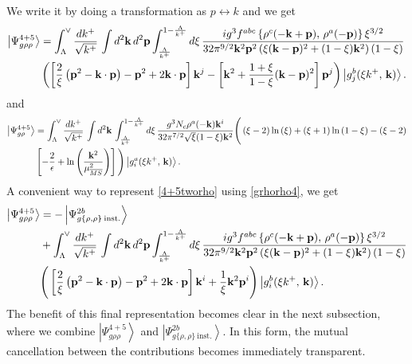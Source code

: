 \documentclass[aps,prd,amsmath,amssymb,nofootinbib]{revtex4-2}
\numberwithin{equation}{section}
\begin{document}
We write it by doing a transformation as $p\leftrightarrow k$ and we get 
\begin{align}\label{4+5tworho}
\left|\Psi_{g\rho\rho}^{4+5}\right\rangle & =
\int_{\Lambda}^{\vee}\frac{dk^{+}}{\sqrt{k^{+}}}\,\int d^{2}\mathbf{k}\, d^{2}\mathbf{p}\int_{\frac{\Lambda}{k^{+}}}^{1-\frac{\Lambda}{k^{+}}}d\xi\,\frac{ig^{3}f^{abc}\left\{ \rho^{c}(-\mathbf{k}+\mathbf{p}),\,\rho^{a}(-\mathbf{p})\right\} \xi^{3/2}}{32\pi^{9/2}\mathbf{k}^{2}\mathbf{p}^{2}\left(\xi(\mathbf{k}-\mathbf{p})^{2}+(1-\xi)\mathbf{k}^{2}\right)(1-\xi)}\notag \\ & \left(\left[\frac{2}{\xi}\left(\mathbf{p}^{2}-\mathbf{k}\cdot \mathbf{p}\right)-\mathbf{p}^{2}+2\mathbf{k}\cdot \mathbf{p}\right]\mathbf{k}^{j}-\left[\mathbf{k}^{2}+\frac{1+\xi}{1-\xi}(\mathbf{k}-\mathbf{p})^{2}\right]\mathbf{p}^{j}\right)\left|g_{j}^{b}(\xi k^{+},\, \mathbf{k})\right\rangle.
\end{align}
and
\begin{align}\label{4+5onerho}
   \left|\Psi_{g\rho}^{4+5}\right\rangle & =  \int_{\Lambda}^{\vee}\frac{dk^{+}}{\sqrt{k^{+}}}\,\int d^{2}\mathbf{k}\,\int_{\frac{\Lambda}{k^{+}}}^{1-\frac{\Lambda}{k^{+}}}d\xi\,\frac{g^{3}N_{c}\rho^{a}(-\mathbf{k})\mathbf{k}^{i}}{32\pi^{7/2}\sqrt{\xi}(1-\xi)\mathbf{k}^{2}}\Bigg(\left(\xi-2\right)\ln\left(\xi\right)+\left(\xi+1\right)\ln\left(1-\xi\right)-\left(\xi-2\right)\notag \\ & \left[-\frac{2}{\epsilon}+\ln\left(\frac{\mathbf{k}^{2}}{\mu_{\overline{MS}}^{2}}\right)\right]\Bigg)\left|g_{i}^{a}(\xi k^{+},\, \mathbf{k})\right\rangle.
\end{align}
A convenient way to represent \eqref{4+5tworho} using \eqref{grhorho4}, we get
\begin{align}\label{4+5tworhosimpl}
\left|\Psi_{g\rho\rho}^{4+5}\right\rangle & =-\left|\Psi_{g\{\rho,\rho\}\:\text{inst.}}^{2b}\right\rangle \notag \\ & 
+\int_{\Lambda}^{\vee}\frac{dk^{+}}{\sqrt{k^{+}}}\,\int d^{2}\mathbf{k}\, d^{2}\mathbf{p}\int_{\frac{\Lambda}{k^{+}}}^{1-\frac{\Lambda}{k^{+}}}d\xi\,\frac{ig^{3}f^{abc}\left\{ \rho^{c}(-\mathbf{k}+\mathbf{p}),\,\rho^{a}(-\mathbf{p})\right\} \xi^{3/2}}{32\pi^{9/2}\mathbf{k}^{2}\mathbf{p}^{2}\left(\xi(\mathbf{k}-\mathbf{p})^{2}+(1-\xi)\mathbf{k}^{2}\right)(1-\xi)}\notag \\ & \Bigg(\left[\frac{2}{\xi}\left(\mathbf{p}^{2}-\mathbf{k}\cdot \mathbf{p}\right)-\mathbf{p}^{2}+2\mathbf{k}\cdot \mathbf{p}\right]\mathbf{k}^{i}+\frac{1}{\xi}\mathbf{k}^{2}\mathbf{p}^{i}\Bigg)\left|g_{i}^{b}(\xi k^{+},\, \mathbf{k})\right\rangle.
\end{align}
The benefit of this final representation becomes clear in the next subsection, where we combine $\left|\Psi_{g\rho\rho}^{4+5}\right\rangle$ and $\left|\Psi_{g\{\rho,\rho\}\:\text{inst.}}^{2b}\right\rangle$. In this form, the mutual cancellation between the contributions becomes immediately transparent.
\end{document}
